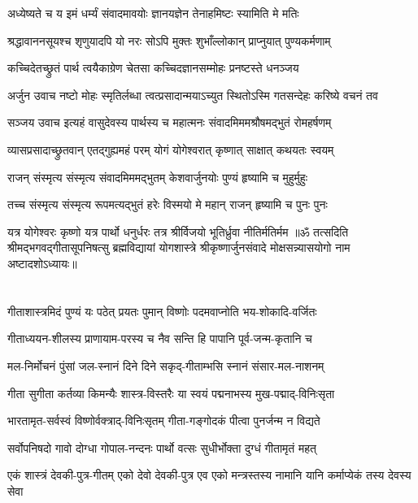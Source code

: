 \twolineshloka
{अध्येष्यते च य इमं धर्म्यं संवादमावयोः}
{ज्ञानयज्ञेन तेनाहमिष्टः स्यामिति मे मतिः}%

\twolineshloka
{श्रद्धावाननसूयश्च शृणुयादपि यो नरः}
{सोऽपि मुक्तः शुभाँल्लोकान् प्राप्नुयात् पुण्यकर्मणाम्}%

\twolineshloka
{कच्चिदेतच्छ्रुतं पार्थ त्वयैकाग्रेण चेतसा}
{कच्चिदज्ञानसम्मोहः प्रनष्टस्ते धनञ्जय}%

{अर्जुन उवाच}
\twolineshloka
{नष्टो मोहः स्मृतिर्लब्धा त्वत्प्रसादान्मयाऽच्युत}
{स्थितोऽस्मि गतसन्देहः करिष्ये वचनं तव}%

{सञ्जय उवाच}
\twolineshloka
{इत्यहं वासुदेवस्य पार्थस्य च महात्मनः}
{संवादमिममश्रौषमद्भुतं रोमहर्षणम्}%

\twolineshloka
{व्यासप्रसादाच्छ्रुतवान् एतद्गुह्यमहं परम्}
{योगं योगेश्वरात् कृष्णात् साक्षात् कथयतः स्वयम्}%

\twolineshloka
{राजन् संस्मृत्य संस्मृत्य संवादमिममद्भुतम्}
{केशवार्जुनयोः पुण्यं हृष्यामि च मुहुर्मुहुः}%

\twolineshloka
{तच्च संस्मृत्य संस्मृत्य रूपमत्यद्भुतं हरेः}
{विस्मयो मे महान् राजन् हृष्यामि च पुनः पुनः}%

\twolineshloka
{यत्र योगेश्वरः कृष्णो यत्र पार्थो धनुर्धरः}
{तत्र श्रीर्विजयो भूतिर्ध्रुवा नीतिर्मतिर्मम}%
{॥ॐ तत्सदिति श्रीमद्भगवद्गीतासूपनिषत्सु ब्रह्मविद्यायां योगशास्त्रे श्रीकृष्णार्जुनसंवादे मोक्षसन्न्यासयोगो नाम अष्टादशोऽध्यायः॥}
\mbox{}\\
\mbox{}\\
\mbox{}\\
\resetShloka
{}
\twolineshloka
{गीताशास्त्रमिदं पुण्यं यः पठेत् प्रयतः पुमान्}
{विष्णोः पदमवाप्नोति भय-शोकादि-वर्जितः}%

\twolineshloka
{गीताध्ययन-शीलस्य प्राणायाम-परस्य च}
{नैव सन्ति हि पापानि पूर्व-जन्म-कृतानि च}%

\twolineshloka
{मल-निर्मोचनं पुंसां जल-स्नानं दिने दिने}
{सकृद्-गीताम्भसि स्नानं संसार-मल-नाशनम्}%

\twolineshloka
{गीता सुगीता कर्तव्या किमन्यैः शास्त्र-विस्तरैः}
{या स्वयं पद्मनाभस्य मुख-पद्माद्-विनिःसृता}%

\twolineshloka
{भारतामृत-सर्वस्वं विष्णोर्वक्त्राद्-विनिःसृतम्}
{गीता-गङ्गोदकं पीत्वा पुनर्जन्म न विद्यते}%

\twolineshloka
{सर्वोपनिषदो गावो दोग्धा गोपाल-नन्दनः}
{पार्थो वत्सः सुधीर्भोक्ता दुग्धं गीतामृतं महत्}%

\fourlineindentedshloka
{एकं शास्त्रं देवकी-पुत्र-गीतम्}
{एको देवो देवकी-पुत्र एव}
{एको मन्त्रस्तस्य नामानि यानि}
{कर्माप्येकं तस्य देवस्य सेवा}%
